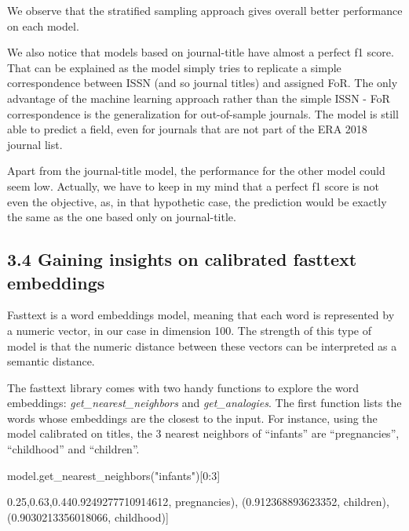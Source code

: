 \documentclass[
]{article}
\newenvironment{Shaded}{}{}
\newcommand{\DecValTok}[1]{\textcolor[rgb]{0.25,0.63,0.44}{#1}}
\newcommand{\FloatTok}[1]{\textcolor[rgb]{0.25,0.63,0.44}{#1}}
\newcommand{\NormalTok}[1]{#1}
\newcommand{\OperatorTok}[1]{\textcolor[rgb]{0.40,0.40,0.40}{#1}}
\newcommand{\StringTok}[1]{\textcolor[rgb]{0.25,0.44,0.63}{#1}}
\begin{document}
We observe that the stratified sampling approach gives overall better
performance on each model.

We also notice that models based on journal-title have almost a perfect
f1 score. That can be explained as the model simply tries to replicate a
simple correspondence between ISSN (and so journal titles) and assigned
FoR. The only advantage of the machine learning approach rather than the
simple ISSN - FoR correspondence is the generalization for out-of-sample
journals. The model is still able to predict a field, even for journals
that are not part of the ERA 2018 journal list.

Apart from the journal-title model, the performance for the other model
could seem low. Actually, we have to keep in my mind that a perfect f1
score is not even the objective, as, in that hypothetic case, the
prediction would be exactly the same as the one based only on
journal-title.

\hypertarget{gaining-insights-on-calibrated-fasttext-embeddings}{%
\subsection{3.4 Gaining insights on calibrated fasttext
embeddings}\label{gaining-insights-on-calibrated-fasttext-embeddings}}

Fasttext is a word embeddings model, meaning that each word is
represented by a numeric vector, in our case in dimension 100. The
strength of this type of model is that the numeric distance between
these vectors can be interpreted as a semantic distance.

The fasttext library comes with two handy functions to explore the word
embeddings: \emph{get\_nearest\_neighbors} and \emph{get\_analogies}.
The first function lists the words whose embeddings are the closest to
the input. For instance, using the model calibrated on titles, the 3
nearest neighbors of ``infants'' are ``pregnancies'', ``childhood'' and
``children''.

\begin{Shaded}
\begin{Highlighting}[]
\NormalTok{model.get\_nearest\_neighbors(}\StringTok{"infants"}\NormalTok{)[}\DecValTok{0}\NormalTok{:}\DecValTok{3}\NormalTok{]}
\end{Highlighting}
\end{Shaded}

\begin{Shaded}
\begin{Highlighting}[]
\NormalTok{[(}\FloatTok{0.9249277710914612}\OperatorTok{,} \StringTok{\textquotesingle{}pregnancies\textquotesingle{}}\NormalTok{)}\OperatorTok{,}
\NormalTok{ (}\FloatTok{0.912368893623352}\OperatorTok{,} \StringTok{\textquotesingle{}children\textquotesingle{}}\NormalTok{)}\OperatorTok{,}
\NormalTok{ (}\FloatTok{0.9030213356018066}\OperatorTok{,} \StringTok{\textquotesingle{}childhood\textquotesingle{}}\NormalTok{)]}
\end{Highlighting}
\end{Shaded}
\end{document}
